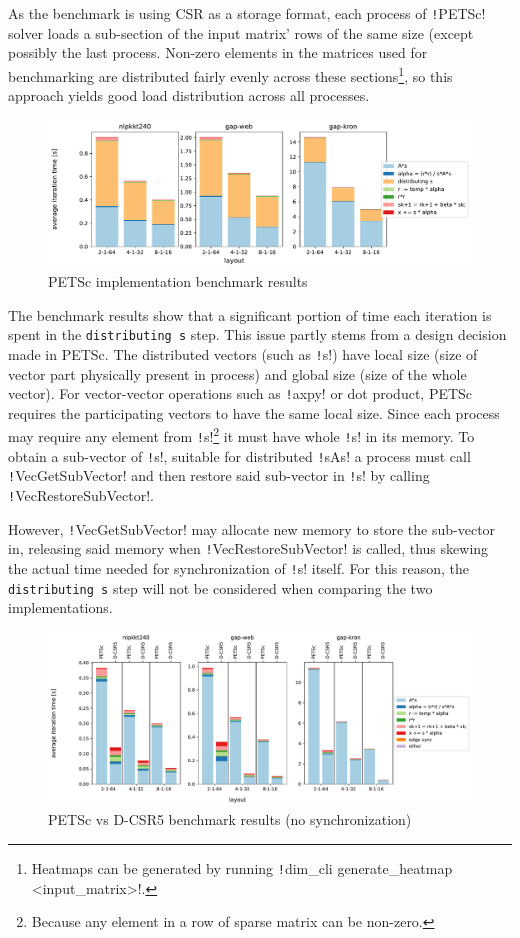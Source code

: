 \documentclass[thesis=M,english]{FITthesis}[2019/12/23]
\newcommand{\csre}[1]{\texttt!#1!}
\begin{document}
As the benchmark is using CSR as a storage format,
each process of \csre{PETSc} solver loads a sub-section of the input matrix' rows of the same size (except possibly the last
process. Non-zero elements in the matrices used for benchmarking are distributed fairly
evenly across these sections\footnote{Heatmaps can be generated by running  \csre{dim_cli generate_heatmap <input_matrix>}.},
so this approach yields good load distribution across all processes.

\begin{figure}[htp]
    \centering
    \includegraphics[scale=0.45]{static/petsc_mpi.pdf}
    \caption{PETSc implementation benchmark results}
\end{figure}

The benchmark results show that a significant portion of time each iteration is spent in the \texttt{distributing s}
step. This issue partly stems from a design decision made in PETSc. The distributed vectors (such as \csre{s})
have local size (size of vector part physically present in process) and global size (size of the whole vector).
For vector-vector operations such as \csre{axpy} or dot product, PETSc requires the participating vectors to
have the same local size. Since each process may require any element from
\csre{s}\footnote{Because any element in a row of sparse matrix can be non-zero.} it must have whole \csre{s}
in its memory. To obtain a sub-vector of \csre{s}, suitable for distributed \csre{sAs} a process must call
\csre{VecGetSubVector} and then restore said sub-vector in \csre{s} by calling \csre{VecRestoreSubVector}.

However, \csre{VecGetSubVector} may allocate new memory to store the sub-vector in, releasing said memory
when \csre{VecRestoreSubVector} is called, thus skewing the actual time needed for synchronization of
\csre{s} itself. For this reason, the \texttt{distributing s} step will not be considered when comparing
the two implementations.

\begin{figure}[htp]
    \centering
    \includegraphics[scale=0.4]{static/petsc_vs_dim.pdf}
    \caption{PETSc vs D-CSR5 benchmark results (no synchronization)}\label{bench:petsc:vsDim}
\end{figure}
\end{document}
